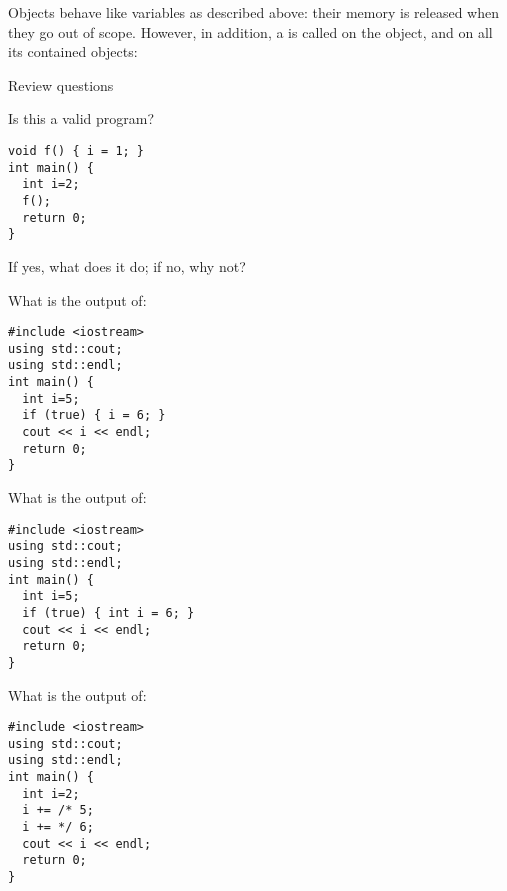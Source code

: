 Objects behave like variables as described above: their memory is
released when they go out of scope. However, in addition, a
 is called on the object, and on all its
contained objects:
%

 {Review questions}

\begin{review}
  \label{ex:cpp-scope1}
  Is this a valid program?
\begin{lstlisting}
void f() { i = 1; }
int main() {
  int i=2;
  f();
  return 0;
}
\end{lstlisting}
If yes, what does it do; if no, why not?
\end{review}

\begin{review}
  \label{ex:cpp-scope2}
  What is the output of:
\begin{lstlisting}
#include <iostream>
using std::cout;
using std::endl;
int main() {
  int i=5;
  if (true) { i = 6; }
  cout << i << endl;
  return 0;
}
\end{lstlisting}
\end{review}

\begin{review}
  \label{ex:cpp-scope3}
  What is the output of:
\begin{lstlisting}
#include <iostream>
using std::cout;
using std::endl;
int main() {
  int i=5;
  if (true) { int i = 6; }
  cout << i << endl;
  return 0;
}
\end{lstlisting}
\end{review}

\begin{review}
  \label{ex:cpp-scope4}
  What is the output of:
\begin{lstlisting}
#include <iostream>
using std::cout;
using std::endl;
int main() {
  int i=2;
  i += /* 5;
  i += */ 6;
  cout << i << endl;
  return 0;
}
\end{lstlisting}
\end{review}

\endinput

Global variables, local variables.

When you defined a function for primality testing, you placed it
outside the main program, and the main program was able to use
it. There are other things than functions that can be defined outside
the main program, such as \indextermsub{global}{variables}.

Here is a program that uses a global variable:
\begin{lstlisting}
int i=5;
int main() {
  i = i+3;
  cout << i << endl;
  return 0;
}
\end{lstlisting}

